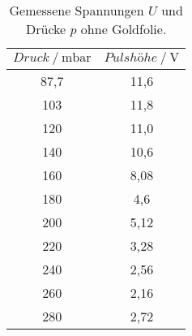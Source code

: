 \begin{table}[H] 
   \centering 
   \caption{Gemessene Spannungen $U$ und Drücke $p$ ohne Goldfolie.} 
   \label{tab:ohne} 
   \begin{tabular} { c c } 
 \toprule 
 {$Druck\:/\: \mathrm{mbar}$} & {$Pulshöhe\:/\: \mathrm{V}$} \\ 
    \midrule 
    87,7 & 11,6 \\ 
    103 & 11,8 \\ 
    120 & 11,0 \\ 
    140 & 10,6 \\ 
    160 & 8,08 \\ 
    180 & 4,6 \\ 
    200 & 5,12 \\ 
    220 & 3,28 \\ 
    240 & 2,56 \\ 
    260 & 2,16 \\ 
    280 & 2,72 \\ 
    \bottomrule 
  \end{tabular}
\end{table}